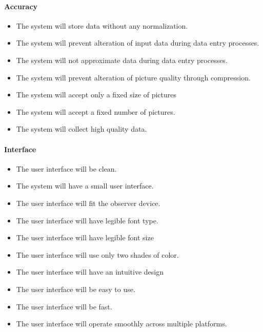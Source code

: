     \paragraph{Accuracy}
        \begin{itemize}
            \item The system will store data without any normalization.
            \item The system will prevent alteration of input data during data entry processes.
            \item The system will not approximate data during data entry processes.
            \item The system will prevent alteration of picture quality through compression.
            \item The system will accept only a fixed size of pictures
            \item The system will accept a fixed number of pictures.
            \item The system will collect high quality data.

        \end{itemize}
    \paragraph{Interface}
        \begin{itemize}
            \item The user interface will be clean.
            \item The system will have a small user interface.
            \item The user interface will fit the observer device.
            \item The user interface will have legible font type.
            \item The user interface will have legible font size
            \item The user interface will use only two shades of color.
            \item The user interface will have an intuitive design
            \item The user interface will be easy to use.
            \item The user interface will be fast.
            \item The user interface will operate smoothly across multiple platforms.

        \end{itemize}
